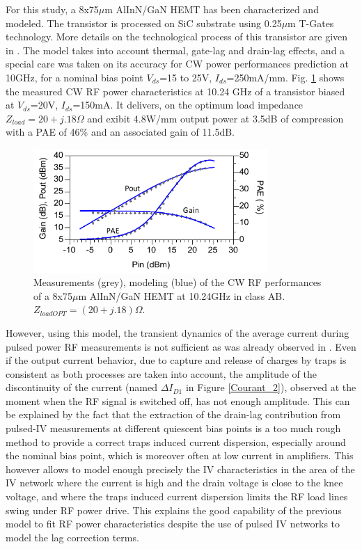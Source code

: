 \documentclass[conference]{IEEEtran}
\begin{document}
For this study, a 8x75$\mu$m AlInN/GaN HEMT has been characterized and modeled. The transistor is processed on SiC substrate using 0.25$\mu$m T-Gates technology. More details on the technological process of this transistor are given in \cite{jardel2012first}. 
The model takes into account thermal, gate-lag and drain-lag effects, and a special care was taken on its accuracy for CW power performances prediction at 10GHz, for a nominal bias point $V_{ds}$=15 to 25V, $I_{ds}$=250mA/mm. 
Fig. \ref{LP} shows the measured CW RF power characteristics at 10.24 GHz of a transistor biased at $V_{ds}$=20V, $I_{ds}$=150mA.  It delivers, on the optimum load impedance $Z_{load}=20+j.18\Omega$ and exibit 4.8W/mm output power at 3.5dB of compression with a PAE of 46\% and an associated gain of 11.5dB. 

\begin{figure}[ht!] %
\centering
\includegraphics[width=3.5in]{FigureLP_ancien_mod.pdf}
\caption{Measurements (grey), modeling (blue) of the CW RF performances of a 8x75$\mu$m AlInN/GaN HEMT at 10.24GHz in class AB. $Z_{loadOPT} = (20+j.18) \Omega$.}
\label{LP}
\end{figure}

However, using this model, the transient dynamics of the average current during pulsed power RF measurements is not sufficient as was already observed in \cite{wamicon}.
Even if the output current behavior, due to capture and release of charges by traps is consistent as both processes are taken into account, the amplitude of the discontinuity of the current (named $\Delta I_{D1}$ in Figure \ref{Courant_2}), observed at the moment when the RF signal is switched off, has not enough amplitude. This can be explained by the fact that the extraction of the drain-lag contribution from pulsed-IV measurements at different quiescent bias points is a too much rough method to provide a correct traps induced current dispersion, especially around the nominal bias point, which is moreover often at low current in amplifiers. This however allows to model enough precisely the IV characteristics in the area of the IV network where the current is high and the drain voltage is close to the knee voltage, and where the traps induced current dispersion limits the RF load lines swing under RF power drive. This explains the good capability of the previous model to fit RF power characteristics despite the use of pulsed IV networks to model the lag correction terms.
\end{document}
